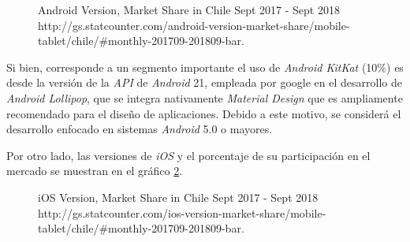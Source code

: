 \begin{figure}[H]
	\centering
	\caption[Android Version, Market Share in Chile Sept 2017 - Sept 2018.]{Android Version, Market Share in Chile Sept 2017 - Sept 2018 \\ http://gs.statcounter.com/android-version-market-share/mobile-tablet/chile/\#monthly-201709-201809-bar.}
	\label{chart:Android Version}
	\begin{bchart}[step=10, max=100, width=.7\textwidth, unit=\%]
	\end{bchart}
\end{figure}

Si bien, corresponde a un segmento importante el uso de \textit{Android KitKat} (10\%) es desde la versión de la \textit{API} de \textit{Android} 21, empleada por google en el desarrollo de \textit{Android Lollipop}, que se integra nativamente \textit{Material Design} que es ampliamente recomendado para el diseño de aplicaciones.  Debido a este motivo, se considerá el desarrollo enfocado en sistemas \textit{Android} 5.0 o mayores.

Por otro lado, las versiones de \textit{iOS} y el porcentaje de su participación en el mercado se muestran en el gráfico \ref{chart:iOS Version}.

\begin{figure}[H]
	\centering
	\caption[iOS Version, Market Share in Chile Sept 2017 - Sept 2018.]{iOS Version, Market Share in Chile Sept 2017 - Sept 2018 \\ http://gs.statcounter.com/ios-version-market-share/mobile-tablet/chile/\#monthly-201709-201809-bar.}
	\label{chart:iOS Version}
	\begin{bchart}[step=10, max=100, width=.8\textwidth, unit=\%]
	\end{bchart}
\end{figure}

